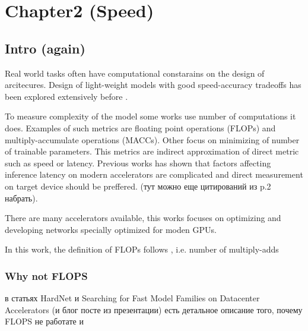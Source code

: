\chapter{Chapter2 (Speed)}



\section{Intro (again)}

Real world tasks often have computational constarains on the design of arcitecures. Design of light-weight models with good speed-accuracy tradeoffs has been explored extensively before \cite{Xception} \cite{mobilenetv1} \cite{mobilenetv2} \cite{ma2018shufflenetv2} \cite{zhang2018shufflenet}. 

To measure complexity of the model some works use number of computations it does. Examples of such metrics are floating point operations (FLOPs) and multiply-accumulate operations (MACCs). Other focus on minimizing of number of trainable parameters. This metrics are indirect approximation of direct metric such as speed or latency. Previous works has shown \cite{design_spaces} that factors affecting inference latency on modern accelerators are complicated and direct measurement on target device should be preffered. (тут можно еще цитирований из \cite{ma2018shufflenetv2} p.2 набрать).

There are many accelerators available, this works focuses on optimizing and developing networks specially optimized for moden GPUs. 


In this work, the definition of FLOPs follows \cite{zhang2018shufflenet}, i.e. number of multiply-adds

\subsection{Why not FLOPS}
в статьях HardNet и Searching for Fast Model Families on Datacenter Accelerators (и блог посте из презентации) есть детальное описание того, почему FLOPS не работате и 

